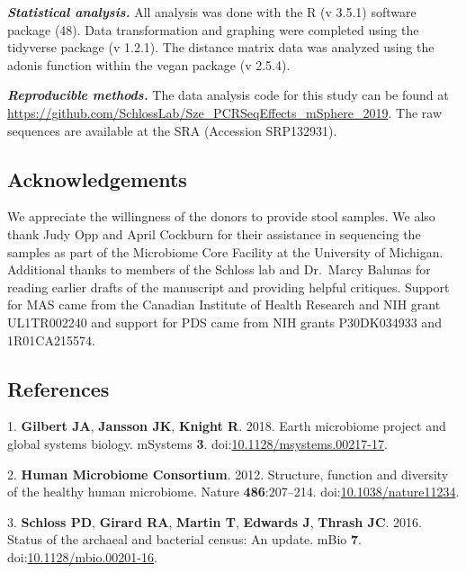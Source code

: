 \documentclass[11pt,]{article}
\begin{document}
\textbf{\emph{Statistical analysis.}} All analysis was done with the R
(v 3.5.1) software package (48). Data transformation and graphing were
completed using the tidyverse package (v 1.2.1). The distance matrix
data was analyzed using the adonis function within the vegan package (v
2.5.4).

\textbf{\emph{Reproducible methods.}} The data analysis code for this
study can be found at
\url{https://github.com/SchlossLab/Sze_PCRSeqEffects_mSphere_2019}. The
raw sequences are available at the SRA (Accession SRP132931).

\hypertarget{acknowledgements}{%
\subsection{Acknowledgements}\label{acknowledgements}}

We appreciate the willingness of the donors to provide stool samples. We
also thank Judy Opp and April Cockburn for their assistance in
sequencing the samples as part of the Microbiome Core Facility at the
University of Michigan. Additional thanks to members of the Schloss lab
and Dr.~Marcy Balunas for reading earlier drafts of the manuscript and
providing helpful critiques. Support for MAS came from the Canadian
Institute of Health Research and NIH grant UL1TR002240 and support for
PDS came from NIH grants P30DK034933 and 1R01CA215574.

\newpage

\hypertarget{references}{%
\subsection{References}\label{references}}

\hypertarget{refs}{}
\leavevmode\hypertarget{ref-Gilbert2018}{}%
1. \textbf{Gilbert JA}, \textbf{Jansson JK}, \textbf{Knight R}. 2018.
Earth microbiome project and global systems biology. mSystems
\textbf{3}.
doi:\href{https://doi.org/10.1128/msystems.00217-17}{10.1128/msystems.00217-17}.

\leavevmode\hypertarget{ref-HMP2012}{}%
2. \textbf{Human Microbiome Consortium}. 2012. Structure, function and
diversity of the healthy human microbiome. Nature \textbf{486}:207--214.
doi:\href{https://doi.org/10.1038/nature11234}{10.1038/nature11234}.

\leavevmode\hypertarget{ref-Schloss2016}{}%
3. \textbf{Schloss PD}, \textbf{Girard RA}, \textbf{Martin T},
\textbf{Edwards J}, \textbf{Thrash JC}. 2016. Status of the archaeal and
bacterial census: An update. mBio \textbf{7}.
doi:\href{https://doi.org/10.1128/mbio.00201-16}{10.1128/mbio.00201-16}.
\end{document}
